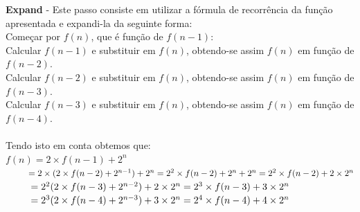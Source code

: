\documentclass[12pt]{article}
\begin{document}
    \noindent \textbf{Expand} - Este passo consiste em utilizar a fórmula de recorrência da função 
apresentada e expandi-la da seguinte forma:  \\
Começar por \(f(n)\), que é função de \(f(n - 1)\):\\
Calcular \(f(n-1)\) e substituir em \(f(n)\), obtendo-se assim \(f(n)\) em função de
\(f(n - 2)\).\\
Calcular \(f(n - 2)\) e substituir em \(f(n)\), obtendo-se assim \(f(n)\) em função de
\(f(n - 3)\).\\
Calcular \(f(n - 3)\) e substituir em \(f(n)\), obtendo-se assim \(f(n)\) em função de
\(f(n - 4)\).\\
 \\
 Tendo isto em conta obtemos que: 
    \\
    \(f(n) = 2 \times f(n - 1) + 2^n \)\\
    \(\hspace*{0.9cm}= 2 \times (2 \times f(n - 2) + 2^{n-1} )+ 2^n = 2^2 \times f(n - 2) + 2^{n} + 2^n = 2^2 \times f(n - 2) + 2 \times 2^n\)\\
    \(\hspace*{0.9cm}= 2^2(2 \times f(n - 3) + 2^{n-2})+ 2 \times 2^n = 2^3 \times f(n - 3) + 3 \times 2^n\)\\
    \(\hspace*{0.9cm}= 2^3 (2 \times f(n - 4) + 2^{n-3}) + 3 \times  2^n = 2^4 \times f(n - 4) + 4 \times 2^n\)\\
    
\end{document}
